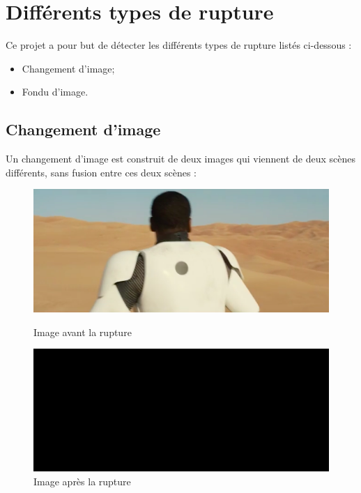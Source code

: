 \section{Différents types de rupture}

Ce projet a pour but de détecter les différents types de rupture listés ci-dessous :

\begin{itemize}
	\item Changement d'image;
	\item Fondu d'image.
\end{itemize}

\subsection{Changement d’image}
Un changement d’image est construit de deux images qui viennent de deux scènes différents, sans fusion entre ces deux scènes :

\begin{figure}[h!]
   \begin{minipage}[c]{.46\linewidth}
	  \centering
      \includegraphics[scale=0.3]{images/rupture1-1.png}
      \caption{\label{Avant} Image avant la rupture}
   \end{minipage} \hfill
   \begin{minipage}[c]{.46\linewidth}
      \centering
      \includegraphics[scale=0.3]{images/rupture1-2.png}
      \caption{\label{Après} Image après la rupture}
   \end{minipage}
\end{figure}


